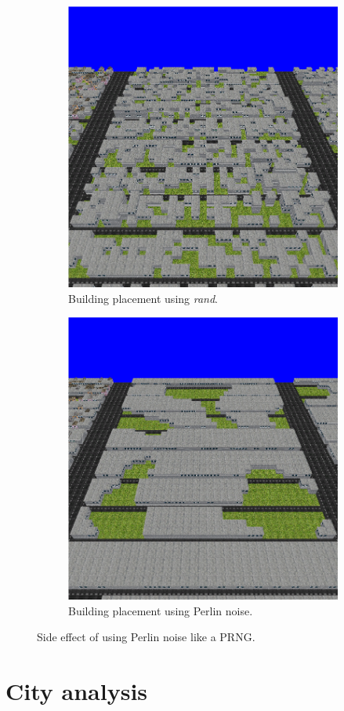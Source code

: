 \begin{figure}[h]
	\centering
	\begin{subfigure}{0.35\textwidth}
		\centering
		\includegraphics[width=0.9\linewidth]{"Images/rand vacant"}
		\caption{Building placement using \textit{rand}.}
		\label{fig:rand-vacant}
	\end{subfigure}
	\begin{subfigure}{0.35\textwidth}
		\centering
		\includegraphics[width=0.9\linewidth]{"Images/perlin vacant"}
		\caption{Building placement using Perlin noise.}
		\label{fig:perlin-vacant}
	\end{subfigure}
	\caption{Side effect of using Perlin noise like a PRNG.}
	\label{fig:perlin-rand-vacant}
\end{figure}
	
\section{City analysis}